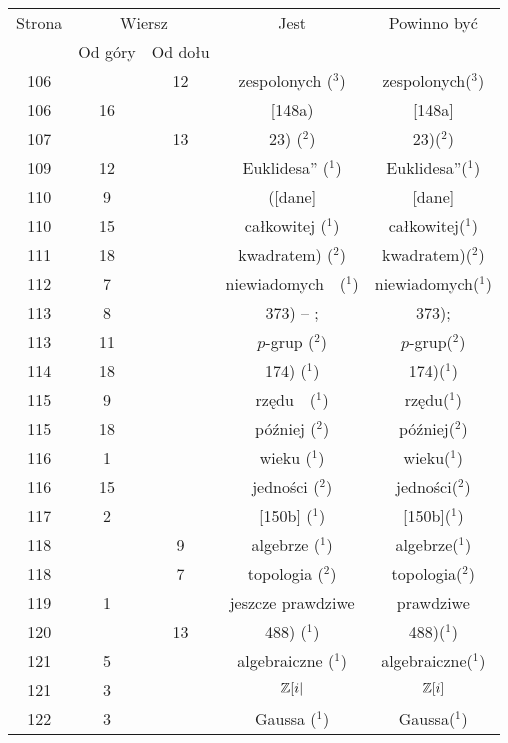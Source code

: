 \documentclass[a4paper,11pt]{article}
\numberwithin{equation}{section}
\begin{document}
\begin{center}
  \begin{tabular}{|c|c|c|c|c|}
    \hline
    Strona & \multicolumn{2}{c|}{Wiersz} & Jest
                              & Powinno być \\ \cline{2-3}
    & Od góry & Od dołu & & \\
    \hline
    106 & & 12 & zespolonych ($^{ 3 }$) & zespolonych($^{ 3 }$) \\
    106 & 16 & & [148a) & [148a] \\
    107 & & 13 & 23) ($^{ 2 }$) & 23)($^{ 2 }$) \\
    109 & 12 & & Euklidesa” ($^{ 1 }$) & Euklidesa”($^{ 1 }$) \\
    110 & \hphantom{0}9 & & ([dane] & [dane] \\
    110 & 15 & & całkowitej ($^{ 1 }$) & całkowitej($^{ 1 }$) \\
    111 & 18 & & kwadratem) ($^{ 2 }$) & kwadratem)($^{ 2 }$) \\
    112 & \hphantom{0}7 & & niewiadomych~~($^{ 1 }$)
    & niewiadomych($^{ 1 }$) \\
    113 & \hphantom{0}8 & & 373) -- ; & 373); \\
    113 & 11 & & $p$-grup ($^{ 2 }$) & $p$-grup($^{ 2 }$) \\
    114 & 18 & & 174) ($^{ 1 }$) & 174)($^{ 1 }$) \\
    115 & \hphantom{0}9 & & rzędu~~($^{ 1 }$) & rzędu($^{ 1 }$) \\
    115 & 18 & & później ($^{ 2 }$) & później($^{ 2 }$) \\
    116 & \hphantom{0}1 & & wieku ($^{ 1 }$) & wieku($^{ 1 }$) \\
    116 & 15 & & jedności ($^{ 2 }$) & jedności($^{ 2 }$) \\
    117 & \hphantom{0}2 & & [150b] ($^{ 1 }$) & [150b]($^{ 1 }$) \\
    118 & & \hphantom{0}9 & algebrze ($^{ 1 }$) & algebrze($^{ 1 }$) \\
    118 & & \hphantom{0}7 & topologia ($^{ 2 }$) & topologia($^{ 2 }$) \\
    119 & \hphantom{0}1 & & jeszcze prawdziwe & prawdziwe \\
    120 & & 13 & 488) ($^{ 1 }$) & 488)($^{ 1 }$) \\
    121 & \hphantom{0}5 & & algebraiczne ($^{ 1 }$)
    & algebraiczne($^{ 1 }$) \\
    121 & \hphantom{0}3 & & $\mathbb{Z}[ i |$ & $\mathbb{Z}[ i ]$ \\
    122 & \hphantom{0}3 & & Gaussa ($^{ 1 }$) & Gaussa($^{ 1 }$) \\

\end{tabular}
\end{center}
\end{document}
